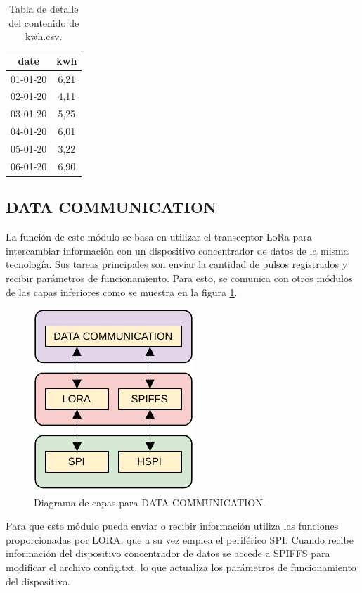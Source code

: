 \begin{table}[h]
	\centering
	\caption[Contenido kwh.csv]{Tabla de detalle del contenido de kwh.csv.}
	\begin{tabular}{c c}    
		\toprule
		\textbf{date} & \textbf{kwh} \\
		\midrule
		01-01-20 & 6,21  \\
		02-01-20 & 4,11  \\
		03-01-20 & 5,25  \\
		04-01-20 & 6,01  \\
		05-01-20 & 3,22  \\
		06-01-20 & 6,90  \\
		\bottomrule
		\hline
	\end{tabular}
	\label{tab:kwhDetail}
\end{table}

\subsection{DATA COMMUNICATION}	

La función de este módulo se basa en utilizar el transceptor LoRa para intercambiar información con un dispositivo concentrador de datos de la misma tecnología. Sus tareas principales son enviar la cantidad de pulsos registrados y recibir parámetros de funcionamiento. Para esto, se comunica con otros módulos de las capas inferiores como se muestra en la figura \ref{fig:loraDiagram}.

\begin{figure}[h]
	\centering
	\includegraphics[scale=1]{./Figures/lora_communication_diagram.pdf}
	\caption{Diagrama de capas para DATA COMMUNICATION.}
		\label{fig:loraDiagram}
\end{figure}

Para que este módulo pueda enviar o recibir información utiliza las funciones proporcionadas por LORA, que a su vez emplea el periférico SPI. Cuando recibe información del dispositivo concentrador de datos se accede a SPIFFS para modificar el archivo config.txt, lo que actualiza los parámetros de funcionamiento del dispositivo.

